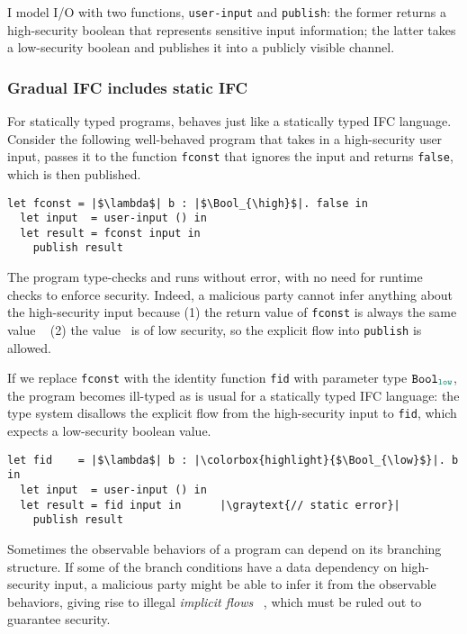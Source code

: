 I model I/O with two functions, \texttt{user-input} and \texttt{publish}: the
former returns a high-security boolean that represents sensitive input
information; the latter takes a low-security boolean and publishes it into a
publicly visible channel.

\subsubsection{Gradual IFC includes static IFC}

For statically typed programs, \Surface behaves just like a statically
typed IFC language. Consider the following well-behaved \Surface
program that takes in a high-security user input, passes it to the
function \texttt{fconst} that ignores the input and
returns \texttt{false}, which is then published.

\begin{lstlisting}[style=tt]
  let fconst = |$\lambda$| b : |$\Bool_{\high}$|. false in
  let input  = user-input () in
  let result = fconst input in
    publish result
\end{lstlisting}

The program type-checks and runs without error, with no need for
runtime checks to enforce security. Indeed, a malicious party cannot
infer anything about the high-security input because (1) the return
value of \texttt{fconst} is always the same value \false~ (2)
the value \false~is of low security, so the explicit flow
into \texttt{publish} is allowed.

If we replace \texttt{fconst} with the identity function \texttt{fid} with
parameter type $\Bool_{\low}$, the program becomes ill-typed as is usual for a
statically typed IFC language: the type system disallows the explicit flow from
the high-security input to \texttt{fid}, which expects a low-security boolean
value.

\begin{lstlisting}[style=tt]
  let fid    = |$\lambda$| b : |\colorbox{highlight}{$\Bool_{\low}$}|. b in
  let input  = user-input () in
  let result = fid input in      |\graytext{// static error}|
    publish result
\end{lstlisting}

Sometimes the observable behaviors of a program can depend on its branching
structure. If some of the branch conditions have a data dependency on
high-security input, a malicious party might be able to infer it from the
observable behaviors, giving rise to illegal \textit{implicit flows}
~\parencite{denning1976lattice}, which must be ruled out to guarantee security.


